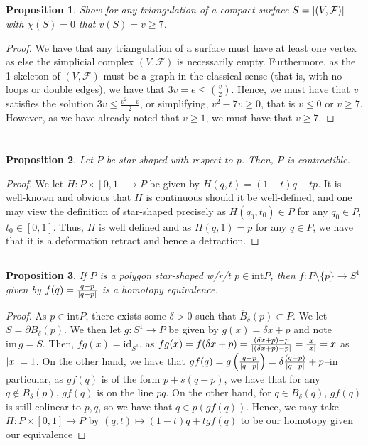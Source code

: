 \documentclass[english]{article}
\DeclarePairedDelimiter\abs{\lvert}{\rvert}%
\newcommand{\prob}[1]{\setcounter{section}{#1-1}\section{}}
\newcommand{\prt}[1]{\setcounter{subsection}{#1-1}\subsection{}}
\newtheorem*{proposition*}{Proposition}
\theoremstyle{remark}
\theoremstyle{definition}
\newcommand{\Fcal}{\mathcal{F}}
\newcommand{\cl}{\overline}
\newcommand{\intr}{\mathrm{int}}
\begin{document}
\prt{3}\begin{proposition*}
	Show for any triangulation of a compact surface $S=\abs{(V,\Fcal)}$ with $\chi(S)=0$ that $v(S)=v\geq 7$.
\end{proposition*}
\begin{proof}
	We have that any triangulation of a surface must have at least one vertex as else the simplicial complex $(V,\Fcal)$ is necessarily empty. Furthermore, as the 1-skeleton of $(V,\Fcal)$ must be a graph in the classical sense (that is, with no loops or double edges), we have that $3v=e\leq{v\choose 2}$. Hence, we must have that $v$ satisfies the solution $3v\leq \frac{v^2-v}{2}$, or simplifying, $v^2-7v\geq 0$, that is $v\leq 0$ or $v\geq 7$. However, as we have already noted that $v\geq 1$, we must have that $v\geq 7$. 
\end{proof}
\prob{2}
\prt{1}
\begin{proposition*}
	Let $P$ be star-shaped with respect to $p$. Then, $P$ is contractible.
\end{proposition*}
\begin{proof}
	We let $H:P\times [0,1]\to P$ be given by $H(q,t)=(1-t)q+tp$. It is well-known and obvious that $H$ is continuous should it be well-defined, and one may view the definition of star-shaped precisely as $H(q_0,t_0)\in P$ for any $q_0\in P$, $t_0\in [0,1]$. Thus, $H$ is well defined and as $H(q,1)=p$ for any $q\in P$, we have that it is a deformation retract and hence a detraction.
\end{proof}
\prt{2}
\begin{proposition*}
	If $P$ is a polygon star-shaped w/r/t $p\in \intr P$, then $f:P\setminus \{p\}\to S^1$ given by $f(q)=\frac{q-p}{\abs{q-p}}$ is a homotopy equivalence.
\end{proposition*}
\begin{proof}
As $p\in \intr P$, there exists some $\delta>0$ such that $\cl{B}_\delta(p)\subset P$. We let $S=\partial \cl{B}_{\delta}(p)$. We then let $g:S^1\to P$ be given by $g(x)=\delta x+p$ and note $\mathrm{im}\,g=S$. Then, $fg(x)=\mathrm{id}_{S^1}$, as $fg(x)=f(\delta x+p)=\frac{(\delta x+p)-p}{\abs{(\delta x+ p)-p}}=\frac{x}{\abs{x}}=x$ as $\abs{x}=1$. On the other hand, we have that $gf(q)=g\left(\frac{q-p}{\abs{q-p}}\right)=\delta\frac{(q-p)}{\abs{q-p}}+p$--in particular, as $gf(q)$ is of the form $p+s(q-p)$, we have that for any $q\not \in B_\delta(p)$, $gf(q)$ is on the line $\cl{pq}$. On the other hand, for $q\in B_\delta(q)$, $gf(q)$ is still colinear to $p,q$, so we have that $q\in \cl{p(gf(q))}$. Hence, we may take $H:P\times[0,1]\to P$ by $(q,t)\mapsto (1-t)q+tgf(q)$ to be our homotopy given our equivalence
\end{proof}
\end{document}
